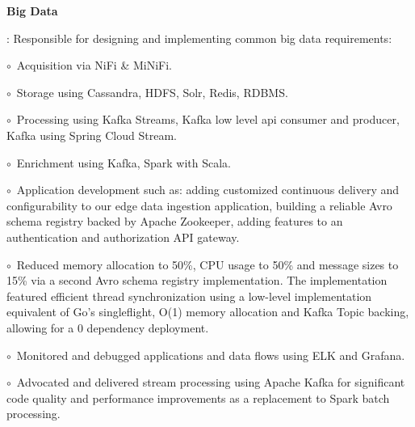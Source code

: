 \documentclass[letterpaper,11pt]{article}
\newcommand{\resumeItem}[2]{
  \item\small{
    \textbf{#1}{: #2 \vspace{-2pt}}
  }
}
\renewcommand{\labelitemii}{$\circ$}
\begin{document}
        \resumeItem{Big Data}{
          Responsible for designing and implementing common big data requirements: 
	  
	  \labelitemii \ Acquisition via NiFi \& MiNiFi.

	  \labelitemii \ Storage using Cassandra, HDFS, Solr, Redis, RDBMS.

	  \labelitemii \ Processing using Kafka Streams, Kafka low level api consumer and producer, Kafka using Spring Cloud Stream.

	  \labelitemii \ Enrichment using Kafka, Spark with Scala.

	  \labelitemii \ Application development such as: adding customized continuous delivery and configurability to our edge data 
	  ingestion application, building a reliable Avro schema registry backed by Apache Zookeeper, adding features to an authentication and authorization API gateway.

	  \labelitemii \ Reduced memory allocation to 50\%, CPU usage to 50\% and message sizes to 15\% via a second Avro schema registry implementation. The implementation featured efficient thread synchronization using a low-level implementation equivalent of Go's singleflight, O(1) memory allocation and Kafka Topic backing, allowing for a 0 dependency deployment.
	  
          \labelitemii \ Monitored and debugged applications and data flows using ELK and Grafana.
          
          \labelitemii \ Advocated and delivered stream processing using Apache Kafka for significant code quality and 
	  performance improvements as a replacement to Spark batch processing.}
\end{document}
